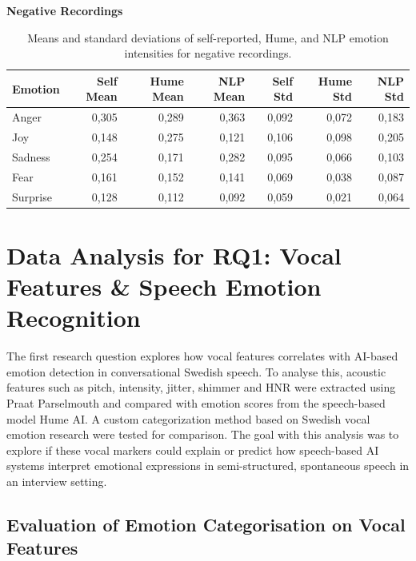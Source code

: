 \begin{table}[H]
    \centering
    \caption*{\textbf{Negative Recordings}}
    \begin{tabular}{lrrrrrr}
      \toprule
      \textbf{Emotion} & \textbf{Self Mean} & \textbf{Hume Mean} & \textbf{NLP Mean} & \textbf{Self Std} & \textbf{Hume Std} & \textbf{NLP Std} \\
      \midrule
      Anger    & 0,305 & 0,289 & 0,363 & 0,092 & 0,072 & 0,183 \\
      Joy      & 0,148 & 0,275 & 0,121 & 0,106 & 0,098 & 0,205 \\
      Sadness  & 0,254 & 0,171 & 0,282 & 0,095 & 0,066 & 0,103 \\
      Fear     & 0,161 & 0,152 & 0,141 & 0,069 & 0,038 & 0,087 \\
      Surprise & 0,128 & 0,112 & 0,092 & 0,059 & 0,021 & 0,064 \\
      \bottomrule
    \end{tabular}
    \caption{Means and standard deviations of self-reported, Hume, and NLP emotion intensities for negative recordings.}
    \label{tab:rq3_emotion-stats_neg}
  \end{table}


\section{Data Analysis for RQ1: Vocal Features \& Speech Emotion Recognition}
The first research question explores how vocal features correlates with AI-based emotion detection in conversational Swedish speech. 
To analyse this, acoustic features such as pitch, intensity, jitter, shimmer and HNR were extracted using Praat Parselmouth and compared with emotion 
scores from the speech-based model Hume AI. A custom categorization method based on Swedish vocal emotion research \autocite{Ekberg2023} were tested for comparison. 
The goal with this analysis was to explore if these vocal markers could explain or predict how speech-based AI systems interpret emotional expressions in 
semi-structured, spontaneous speech in an interview setting. 

\subsection{Evaluation of Emotion Categorisation on Vocal Features}
\label{rq1_pilot_tests}

